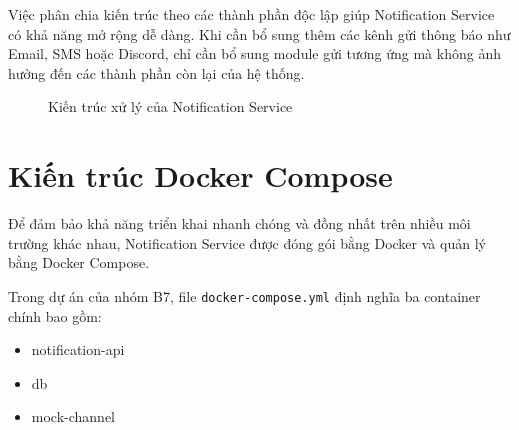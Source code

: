 Việc phân chia kiến trúc theo các thành phần độc lập giúp Notification Service có khả năng mở rộng dễ dàng. Khi cần bổ sung thêm các kênh gửi thông báo như Email, SMS hoặc Discord, chỉ cần bổ sung module gửi tương ứng mà không ảnh hưởng đến các thành phần còn lại của hệ thống.

\begin{figure}[H]
\centering
{}
\caption{Kiến trúc xử lý của Notification Service}
\label{fig:notification-architecture}
\end{figure}


\section{Kiến trúc Docker Compose}

Để đảm bảo khả năng triển khai nhanh chóng và đồng nhất trên nhiều môi trường khác nhau, Notification Service được đóng gói bằng Docker và quản lý bằng Docker Compose.

Trong dự án của nhóm B7, file \texttt{docker-compose.yml} định nghĩa ba container chính bao gồm:

\begin{itemize}
\item notification-api
\item db
\item mock-channel
\end{itemize}

